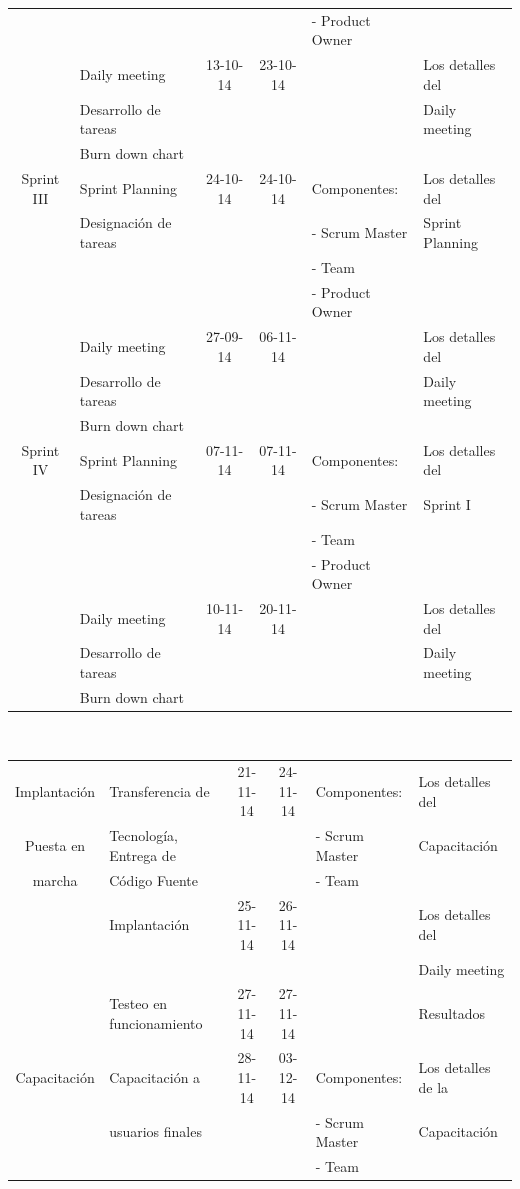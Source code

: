 \documentclass[11pt,letterpaper]{report}
\begin{document}
\begin{tabular}{|c|p{4cm}|c|c|l|p{3cm}|}
	& & & & - Product Owner & \\
	\cline{2-4} \cline{6-6}
	& Daily meeting & 13-10-14 & 23-10-14 & & Los detalles del  \\ 
	& Desarrollo de tareas &&&& Daily meeting\\
	& Burn down chart &&&& \\
	\hline %
	Sprint III& Sprint Planning & 24-10-14 & 24-10-14 &  Componentes: & Los detalles del \\
	& Designación de tareas &  &  & - Scrum Master & Sprint Planning \\
	& & & & - Team & \\
	& & & & - Product Owner & \\
	\cline{2-4} \cline{6-6}
	& Daily meeting & 27-09-14 & 06-11-14 & & Los detalles del  \\ 
	& Desarrollo de tareas &&&& Daily meeting\\
	& Burn down chart &&&& \\
	\hline %
	Sprint IV& Sprint Planning & 07-11-14 & 07-11-14 &  Componentes: & Los detalles del \\
	& Designación de tareas &  &  & - Scrum Master & Sprint I \\
	& & & & - Team & \\
	& & & & - Product Owner & \\
	\cline{2-4} \cline{6-6}
	& Daily meeting & 10-11-14 & 20-11-14 & & Los detalles del  \\ 
	& Desarrollo de tareas &&&& Daily meeting\\
	& Burn down chart &&&& \\
	\hline %
	
\end{tabular}\\
\newpage
\begin{tabular}{|c|p{4cm}|c|c|l|p{3cm}|}
	\hline
	Implantación & Transferencia de & 21-11-14 & 24-11-14 &  Componentes: & Los detalles del \\
	Puesta en & Tecnología, Entrega de &  &  & - Scrum Master & Capacitación \\
	marcha& Código Fuente & & & - Team & \\
	\cline{2-4} \cline{6-6}
	& Implantación & 25-11-14 & 26-11-14 & & Los detalles del  \\ 
	& &&&& Daily meeting\\
	\cline{2-4} \cline{6-6}
	& Testeo en funcionamiento  & 27-11-14 & 27-11-14 && Resultados \\
	\hline %
	Capacitación & Capacitación a  & 28-11-14 & 03-12-14 &  Componentes: & Los detalles de la \\
	& usuarios finales &  &  & - Scrum Master & Capacitación \\
	& & & & - Team & \\
	\hline %
\end{tabular}
\end{document}

